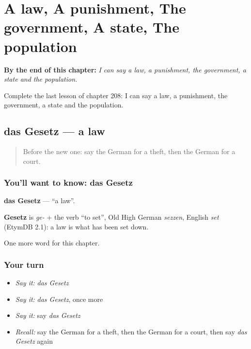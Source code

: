 
\chapter{A law, A punishment, The government, A state, The population}
\label{ch:ge-a-law-a-punishment-the-government-a-state-the-population}

\begin{chapteropening}
\textbf{By the end of this chapter:} \emph{I can say a law, a punishment, the government, a state and the population.}

Complete the last lesson of chapter 208: I can say a law, a punishment, the government, a state and the population.
\end{chapteropening}

\section[das Gesetz]{das Gesetz — a law}

\label{lesson:GE-C208-gesetz}



\begin{quote}
Before the new one: say the German for a theft, then the German for a court.
\end{quote}

\subsection*{You'll want to know: das Gesetz}
\textbf{das Gesetz} — \textquotedblleft{}a law\textquotedblright{}.

\begin{cousinweb}
\textbf{Gesetz} is \emph{ge-} + the verb \textquotedblleft{}to set\textquotedblright{}, Old High German \emph{sezzen}, English \emph{set} (EtymDB 2.1): a law is what has been set down.
\end{cousinweb}

\begin{grammarlens}[title={What you've built}]
One more word for this chapter.
\end{grammarlens}

\subsection*{Your turn}
\begin{itemize}
\raggedright
  \item \emph{Say it:} \emph{das Gesetz}
  \item \emph{Say it:} \emph{das Gesetz}, once more
  \item \emph{Say it:} say \emph{das Gesetz}
  \item \emph{Recall:} say the German for a theft, then the German for a court, then say \emph{das Gesetz} again
\end{itemize}


